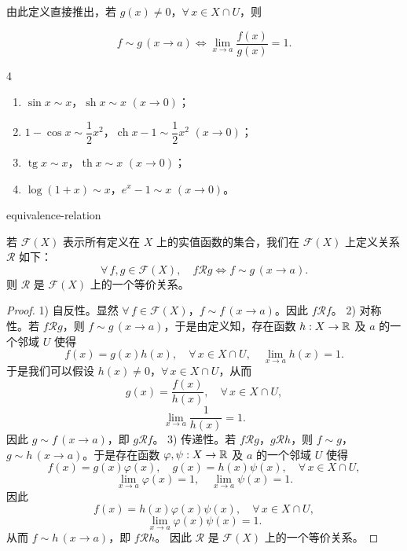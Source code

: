 由此定义直接推出，若 $g(x)\neq0$，$\forall\,x\in X\cap U$，则

\[f\sim g\,(x\to a)\Longleftrightarrow\lim_{x\to a}\frac{f(x)}{g(x)}=1.\]

\begin{sourceexample}{4}

\begin{enumerate}[label=\arabic{enumi})]
\item $\sin x\sim x$，$\operatorname{sh}x\sim x$ $(x\to0)$；
\item $1-\cos x\sim\dfrac{1}{2}x^2$，$\operatorname{ch}x-1\sim\dfrac{1}{2}x^2$ $(x\to0)$；
\item $\operatorname{tg}x\sim x$，$\operatorname{th}x\sim x$ $(x\to0)$；
\item $\log(1+x)\sim x$，$e^x-1\sim x$ $(x\to0)$。
\end{enumerate}

\end{sourceexample}

\begin{mythm}{}{equivalence-relation}

若 $\mathscr{F}(X)$ 表示所有定义在 $X$ 上的实值函数的集合，我们在 $\mathscr{F}(X)$ 上定义关系 $\mathscr{R}$ 如下：
\[\forall\,f,g\in\mathscr{F}(X),\quad f\mathscr{R}g\Longleftrightarrow f\sim g\,(x\to a).\]
则 $\mathscr{R}$ 是 $\mathscr{F}(X)$ 上的一个等价关系。

\end{mythm}

\begin{proof}

1) 自反性。显然 $\forall\,f\in\mathscr{F}(X)$，$f\sim f\,(x\to a)$。因此 $f\mathscr{R}f$。
2) 对称性。若 $f\mathscr{R}g$，则 $f\sim g\,(x\to a)$，于是由定义知，存在函数 $h:X\to\mathbb{R}$ 及 $a$ 的一个邻域 $U$ 使得
\[f(x)=g(x)h(x),\quad \forall\,x\in X\cap U,\quad \lim_{x\to a}h(x)=1.\]
于是我们可以假设 $h(x)\neq0$，$\forall\,x\in X\cap U$，从而
\[g(x)=\frac{f(x)}{h(x)},\quad \forall\,x\in X\cap U,\]
\[\lim_{x\to a}\frac{1}{h(x)}=1.\]
因此 $g\sim f\,(x\to a)$，即 $g\mathscr{R}f$。
3) 传递性。若 $f\mathscr{R}g$，$g\mathscr{R}h$，则 $f\sim g$，$g\sim h\,(x\to a)$。于是存在函数 $\varphi,\psi:X\to\mathbb{R}$ 及 $a$ 的一个邻域 $U$ 使得
\[f(x)=g(x)\varphi(x),\quad g(x)=h(x)\psi(x),\quad \forall\,x\in X\cap U,\]
\[\lim_{x\to a}\varphi(x)=1,\quad \lim_{x\to a}\psi(x)=1.\]
因此
\[f(x)=h(x)\varphi(x)\psi(x),\quad \forall\,x\in X\cap U,\]
\[\lim_{x\to a}\varphi(x)\psi(x)=1.\]
从而 $f\sim h\,(x\to a)$，即 $f\mathscr{R}h$。
因此 $\mathscr{R}$ 是 $\mathscr{F}(X)$ 上的一个等价关系。

\end{proof}

